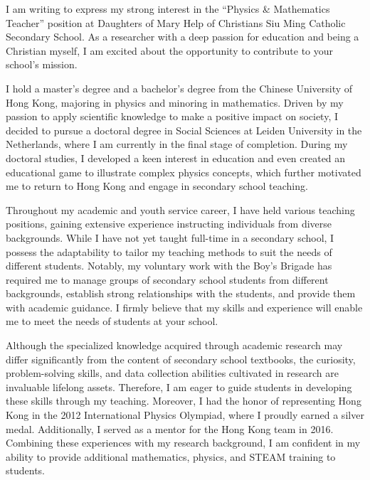 \documentclass[11pt, a4paper]{awesome-cv}
\begin{document}
\makecvheader[R]

\makecvfooter
  {}%
  {}%
  {}

\makelettertitle

\begin{cvletter}

I am writing to express my strong interest in the ``Physics \& Mathematics Teacher'' position at Daughters of Mary Help of Christians Siu Ming Catholic Secondary School. As a researcher with a deep passion for education and being a Christian myself, I am excited about the opportunity to contribute to your school's mission.

I hold a master's degree and a bachelor's degree from the Chinese University of Hong Kong, majoring in physics and minoring in mathematics. Driven by my passion to apply scientific knowledge to make a positive impact on society, I decided to pursue a doctoral degree in Social Sciences at Leiden University in the Netherlands, where I am currently in the final stage of completion. During my doctoral studies, I developed a keen interest in education and even created an educational game to illustrate complex physics concepts, which further motivated me to return to Hong Kong and engage in secondary school teaching.

Throughout my academic and youth service career, I have held various teaching positions, gaining extensive experience instructing individuals from diverse backgrounds. While I have not yet taught full-time in a secondary school, I possess the adaptability to tailor my teaching methods to suit the needs of different students. Notably, my voluntary work with the Boy's Brigade has required me to manage groups of secondary school students from different backgrounds, establish strong relationships with the students, and provide them with academic guidance. I firmly believe that my skills and experience will enable me to meet the needs of students at your school.

Although the specialized knowledge acquired through academic research may differ significantly from the content of secondary school textbooks, the curiosity, problem-solving skills, and data collection abilities cultivated in research are invaluable lifelong assets. Therefore, I am eager to guide students in developing these skills through my teaching. Moreover, I had the honor of representing Hong Kong in the 2012 International Physics Olympiad, where I proudly earned a silver medal. Additionally, I served as a mentor for the Hong Kong team in 2016. Combining these experiences with my research background, I am confident in my ability to provide additional mathematics, physics, and STEAM training to students.


\end{cvletter}
\end{document}
